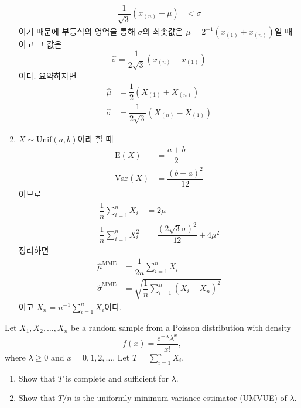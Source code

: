 \documentclass[answers]{exam}
\begin{document}
\begin{questions}
\begin{solution}
\begin{enumerate}
\begin{align}
        \dfrac{1}{\sqrt{3}}\left(x_{\left(n\right)}-\mu\right)&<\sigma
      \end{align}
      이기 때문에 부등식의 영역을 통해 $\sigma$의 최솟값은 $\mu=2^{-1}\left(x_{\left(1\right)}+x_{\left(n\right)}\right)$일 때이고 그 값은
      \begin{equation}
        \widehat{\sigma} = \dfrac{1}{2\sqrt{3}}\left(x_{\left(n\right)}-x_{\left(1\right)}\right)
      \end{equation}
      이다. 요약하자면
      \begin{align}
        \widehat{\mu} &= \dfrac{1}{2}\left(X_{\left(1\right)}+X_{\left(n\right)}\right)\\
        \widehat{\sigma} &= \dfrac{1}{2\sqrt{3}}\left(X_{\left(n\right)}-X_{\left(1\right)}\right)
      \end{align}
      \item $X\sim \mathrm{Unif}\left(a,b\right)$이라 할 때
      \begin{align}
        \mathrm{E}\left(X\right) &= \dfrac{a+b}{2}\\
        \mathrm{Var}\left(X\right) &= \dfrac{\left(b-a\right)^{2}}{12}
      \end{align}
      이므로
      \begin{align}
        \dfrac{1}{n}\sum_{i=1}^{n}X_{i} &= 2\mu\\
        \dfrac{1}{n}\sum_{i=1}^{n}X_{i}^{2} &= \dfrac{\left(2\sqrt{3}\sigma\right)^{2}}{12}+4\mu^{2}
      \end{align}
      정리하면
      \begin{align}
        \widehat{\mu}^{\text{MME}} &= \dfrac{1}{2n}\sum_{i=1}^{n}X_{i}\\
        \widehat{\sigma}^{\text{MME}} &= \sqrt{\dfrac{1}{n}\sum_{i=1}^{n}\left(X_{i}-\overline{X}_{n}\right)^{2}}
      \end{align}
      이고 $\overline{X}_{n}=n^{-1}\sum_{i=1}^{n}X_{i}$이다.
    \end{enumerate}
   \end{solution}
   \question
   Let $X_{1},X_{2},\ldots,X_{n}$ be a random sample from a Poisson distribution with density
   $$
    f\left(x\right)=\dfrac{e^{-\lambda}\lambda^{x}}{x!},
   $$
   where $\lambda \geq 0$ and $x=0,1,2,\ldots$. Let $T=\displaystyle \sum_{i=1}^{n}X_{i}$.
   \begin{enumerate}
    \item Show that $T$ is complete and sufficient for $\lambda$.
    \item Show that $T/n$ is the uniformly minimum variance estimator (UMVUE) of $\lambda$.

\end{enumerate}
\end{questions}
\end{document}
